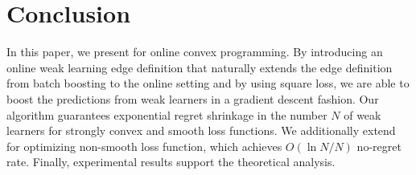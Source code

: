 







\section{Conclusion}
In this paper, we present \algshort for online convex programming. By introducing an online weak learning edge definition that naturally extends the edge definition from batch boosting to the online setting and by using square loss, we are able to boost the predictions from weak learners in a gradient descent fashion. Our \algshort algorithm guarantees exponential regret shrinkage in the number $N$ of weak learners for strongly convex and smooth loss functions. We additionally extend \algshort for optimizing non-smooth loss function, which achieves $O(\ln N/N)$ no-regret rate. Finally, experimental results support the theoretical analysis.

